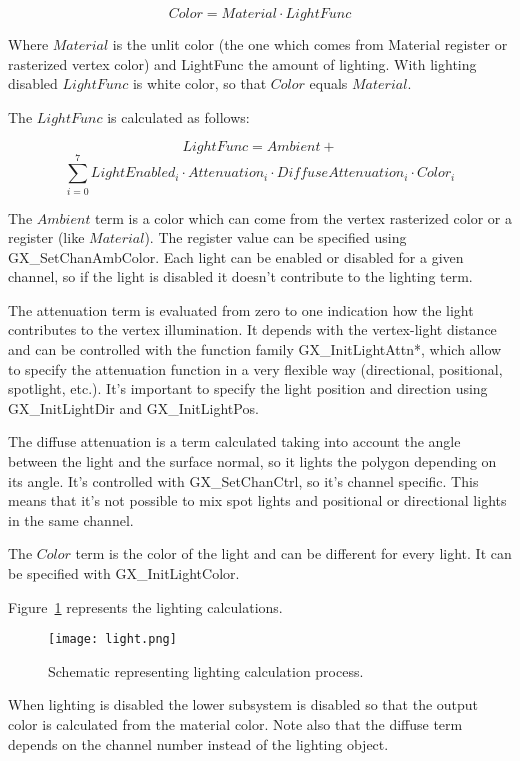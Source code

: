 \documentclass[12pt]{article}
\newcommand{\fname}[1] {{\color{blue}#1}}
\begin{document}
$$ Color = Material \cdot LightFunc $$

Where $Material$ is the unlit color (the one which comes from Material register or rasterized vertex color) and LightFunc the amount of lighting. With lighting disabled $LightFunc$ is white color, so that $Color$ equals $Material$.

The $LightFunc$ is calculated as follows:

$$LightFunc = Ambient + $$
$$ \sum_{i=0}^7 LightEnabled_i \cdot Attenuation_i \cdot DiffuseAttenuation_i \cdot Color_i $$

The $Ambient$ term is a color which can come from the vertex rasterized color or a register (like $Material$). The register value can be specified using \fname{GX\_SetChanAmbColor}. Each light can be enabled or disabled for a given channel, so if the light is disabled it doesn't contribute to the lighting term.

The attenuation term is evaluated from zero to one indication how the light contributes to the vertex illumination. It depends with the vertex-light distance and can be controlled with the function family \fname{GX\_InitLightAttn*}, which allow to specify the attenuation function in a very flexible way (directional, positional, spotlight, etc.). It's important to specify the light position and direction using \fname{GX\_InitLightDir} and \fname{GX\_InitLightPos}.

The diffuse attenuation is a term calculated taking into account the angle between the light and the surface normal, so it lights the polygon depending on its angle. It's controlled with \fname{GX\_SetChanCtrl}, so it's channel specific. This means that it's not possible to mix spot lights and positional or directional lights in the same channel.

The $Color$ term is the color of the light and can be different for every light. It can be specified with \fname{GX\_InitLightColor}.

Figure~\ref{fig:lights} represents the lighting calculations.

\begin{figure}[ht]
\centering
\texttt{[image: light.png]}
\caption{Schematic representing lighting calculation process. }
\label{fig:lights}
\end {figure}

When lighting is disabled the lower subsystem is disabled so that the output color is calculated from the material color. Note also that the diffuse term depends on the channel number instead of the lighting object.
\end{document}
